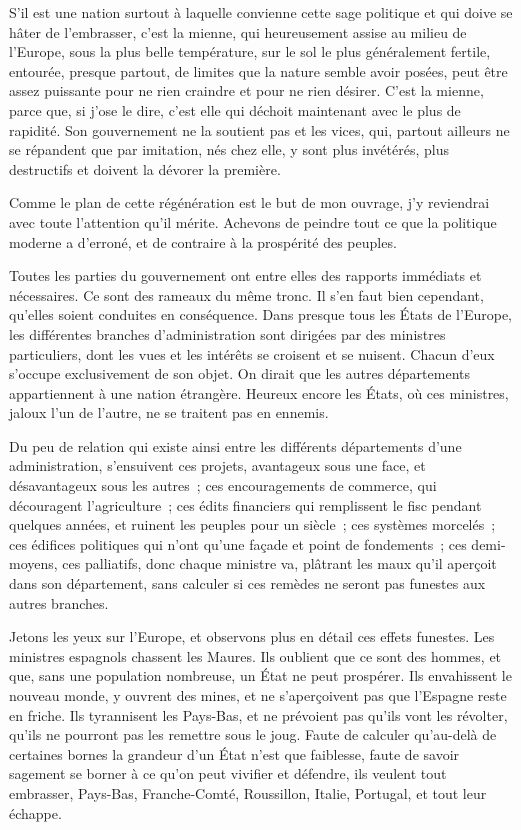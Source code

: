 \documentclass[french,twoside]{book} %
\begin{document}
S’il est une nation surtout à laquelle convienne cette sage politique et qui doive se hâter de l’embrasser, c’est la mienne, qui heureusement assise au milieu de l’Europe, sous la plus belle température, sur le sol le plus généralement fertile, entourée, presque partout, de limites que la nature semble avoir posées, peut être assez puissante pour ne rien craindre et pour ne rien désirer. C’est la mienne, parce que, si j’ose le dire, c’est elle qui déchoit maintenant avec le plus de rapidité. Son gouvernement ne la soutient pas et les vices, qui, partout ailleurs ne se répandent que par imitation, nés chez elle, y sont plus invétérés, plus destructifs et doivent la dévorer la première.\par
Comme le plan de cette régénération est le but de mon ouvrage, j’y reviendrai avec toute l’attention qu’il mérite. Achevons de peindre tout ce que la politique moderne a d’erroné, et de contraire à la prospérité des peuples.\par
Toutes les parties du gouvernement ont entre elles des rapports immédiats et nécessaires. Ce sont des rameaux du même tronc. Il s’en faut bien cependant, qu’elles soient conduites en conséquence. Dans presque tous les États de l’Europe, les différentes branches d’administration sont dirigées par des ministres particuliers, dont les vues et les intérêts se croisent et se nuisent. Chacun d’eux s’occupe exclusivement de son objet. On dirait que les autres départements appartiennent à une nation étrangère. Heureux encore les États, où ces ministres, jaloux l’un de l’autre, ne se traitent pas en ennemis.\par
Du peu de relation qui existe ainsi entre les différents départements d’une administration, s’ensuivent ces projets, avantageux sous une face, et désavantageux sous les autres ; ces encouragements de commerce, qui découragent l’agriculture ; ces édits financiers qui remplissent le fisc pendant quelques années, et ruinent les peuples pour un siècle ; ces systèmes morcelés ; ces édifices politiques qui n’ont qu’une façade et point de fondements ; ces demi-moyens, ces palliatifs, donc chaque ministre va, plâtrant les maux qu’il aperçoit dans son département, sans calculer si ces remèdes ne seront pas funestes aux autres branches.\par
Jetons les yeux sur l’Europe, et observons plus en détail ces effets funestes. Les ministres espagnols chassent les Maures. Ils oublient que ce sont des hommes, et que, sans une population nombreuse, un État ne peut prospérer. Ils envahissent le nouveau monde, y ouvrent des mines, et ne s’aperçoivent pas que l’Espagne reste en friche. Ils tyrannisent les Pays-Bas, et ne prévoient pas qu’ils vont les révolter, qu’ils ne pourront pas les remettre sous le joug. Faute de calculer qu’au-delà de certaines bornes la grandeur d’un État n’est que faiblesse, faute de savoir sagement se borner à ce qu’on peut vivifier et défendre, ils veulent tout embrasser, Pays-Bas, Franche-Comté, Roussillon, Italie, Portugal, et tout leur échappe.\par
\end{document}
